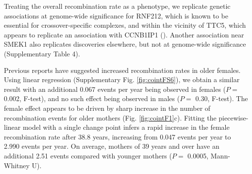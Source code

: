 
Treating the overall recombination rate as a phenotype, we
replicate genetic associations at genome-wide significance for
RNF212, which is known to be essential for crossover-specific
complexes\cite{Reynolds2013}, and within the vicinity of TTC5, which appears
to replicate an association with CCNB1IP1 (\citet{Kong2014}). Another
association near SMEK1 also replicates discoveries elsewhere\cite{Kong2014},
but not at genome-wide significance (Supplementary Table 4).

Previous reports have suggested increased recombination rates
in older females\cite{Kong2004,Coop2008}. Using linear regression (Supplementary
Fig. \ref{fig:cointFS6}), we obtain a similar result with an additional 0.067
events per year being observed in females ($P=$ 0.002, F-test), and
no such effect being observed in males ($P=$ 0.30, F-test). The
female effect appears to be driven by sharp increase in the
number of recombination events for older mothers (Fig. \ref{fig:cointF1}c).
Fitting the piecewise-linear model with a single change point
infers a rapid increase in the female recombination rate after 38.8
years, increasing from 0.047 events per year to 2.990 events per
year. On average, mothers of 39 years and over have an additional
2.51 events compared with younger mothers ($P=$ 0.0005,
Mann-Whitney U).

